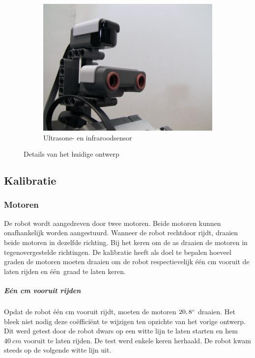 \documentclass[eind]{penoverslag}
\begin{document}
\begin{figure}
\begin{subfigure}[h]{0.325\textwidth}
		\includegraphics[width=\textwidth]{robotSensoren}
		\caption{Ultrasone- en infraroodsensor}
	\end{subfigure}
\caption{Details van het huidige ontwerp}
\label{fig:robotDetail}
\end{figure}

\subsection{Kalibratie}
\label{ssec:Kalib}
\subsubsection{Motoren}
De robot wordt aangedreven door twee motoren. Beide motoren kunnen onafhankelijk worden aangestuurd. Wanneer de robot rechtdoor rijdt, draaien beide motoren in dezelfde richting. Bij het keren om de as draaien de motoren in tegenovergestelde richtingen. De kalibratie heeft als doel te bepalen hoeveel graden de motoren moeten draaien om de robot respectievelijk \'e\'en cm vooruit de laten rijden en \'e\'en~graad te laten keren.

\subparagraph{E\'en cm vooruit rijden}
Opdat de robot \'e\'en cm vooruit rijdt, moeten de motoren $20,8\degree$ draaien. Het bleek niet nodig deze co\"effici\"ent te wijzigen ten opzichte van het vorige ontwerp. Dit werd getest door de robot dwars op een witte lijn te laten starten en hem $40~cm$ vooruit te laten rijden. De test werd enkele keren herhaald. De robot kwam steeds op de volgende witte lijn uit.

\end{document}
